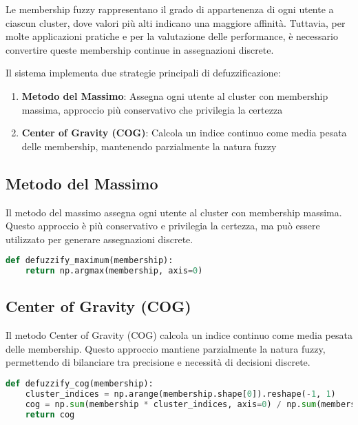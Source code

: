 Le membership fuzzy rappresentano il grado di appartenenza di ogni utente a ciascun cluster, dove valori più alti indicano una maggiore affinità. Tuttavia, per molte applicazioni pratiche e per la valutazione delle performance, è necessario convertire queste membership continue in assegnazioni discrete.

Il sistema implementa due strategie principali di defuzzificazione:

\begin{enumerate}
    \item \textbf{Metodo del Massimo}: Assegna ogni utente al cluster con membership massima, approccio più conservativo che privilegia la certezza
    \item \textbf{Center of Gravity (COG)}: Calcola un indice continuo come media pesata delle membership, mantenendo parzialmente la natura fuzzy
\end{enumerate}

\subsection{Metodo del Massimo}

Il metodo del massimo assegna ogni utente al cluster con membership massima. Questo approccio è più conservativo e privilegia la certezza, ma può essere utilizzato per generare assegnazioni discrete.


\begin{lstlisting}[language=Python, caption=Defuzzificazione per massimo]
def defuzzify_maximum(membership):
    return np.argmax(membership, axis=0)
\end{lstlisting}

\subsection{Center of Gravity (COG)}

Il metodo Center of Gravity (COG) calcola un indice continuo come media pesata delle membership. Questo approccio mantiene parzialmente la natura fuzzy, permettendo di bilanciare tra precisione e necessità di decisioni discrete.

\begin{lstlisting}[language=Python, caption=Defuzzificazione COG]
def defuzzify_cog(membership):
    cluster_indices = np.arange(membership.shape[0]).reshape(-1, 1)
    cog = np.sum(membership * cluster_indices, axis=0) / np.sum(membership, axis=0)
    return cog
\end{lstlisting}

